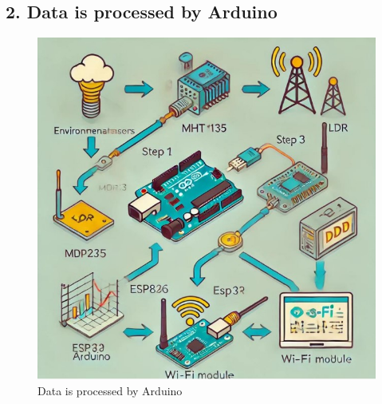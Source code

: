 \documentclass[12pt]{report}
\begin{document}
	\subsection*{2. Data is processed by Arduino}
	\begin{figure}[ht]
		\centering
		\includegraphics[scale=1]{dataprocess.jpg}
		\caption[data_process]{Data is processed by Arduino}
		\label{data_process}
	\end{figure}
	
\end{document}
